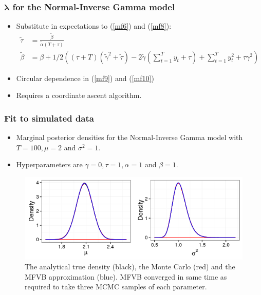 \documentclass{beamer}\usepackage[]{graphicx}\usepackage[]{color}
\begin{document}
\begin{frame}
\frametitle{$\boldsymbol{\lambda}$ for the Normal-Inverse Gamma model}
\begin{itemize}
\item Substitute in expectations to (\ref{mf6}) and (\ref{mf8}):
\begin{align}
\tilde{\tau} &= \frac{\tilde{\beta}}{\tilde{\alpha}(T + \tau)} \label{mf9} \\
\tilde{\beta} &= \beta + 1/2\left((\tau + T)(\tilde{\gamma}^2 + \tilde{\tau}) - 2 \tilde{\gamma}\left(\sum_{t=1}^{T}y_t + \tau \right) + \sum_{t=1}^{T} y_t^2 + \tau \gamma^2 \right)\label{mf10}
\end{align}
\item Circular dependence in (\ref{mf9}) and (\ref{mf10}) 
\item Requires a coordinate ascent algorithm.
\end{itemize}
\end{frame}


\begin{frame}
\frametitle{Fit to simulated data}
\begin{itemize}
\item Marginal posterior densities for the Normal-Inverse Gamma model with $T = 100, \mu = 2$ and $\sigma^2 = 1$.
\item Hyperparameters are $\gamma = 0, \tau = 1, \alpha = 1$ and $\beta = 1$. 
\end{itemize}
\begin{figure}[h]
\centering
\includegraphics[width=0.7\linewidth,height=\textheight,keepaspectratio]{norminvg}
\caption{The analytical true density (black), the Monte Carlo (red) and the MFVB approximation (blue). MFVB converged in same time as required to take three MCMC samples of each parameter.}
\label{fig:norminvg}
\end{figure}
\end{frame}
\end{document}

